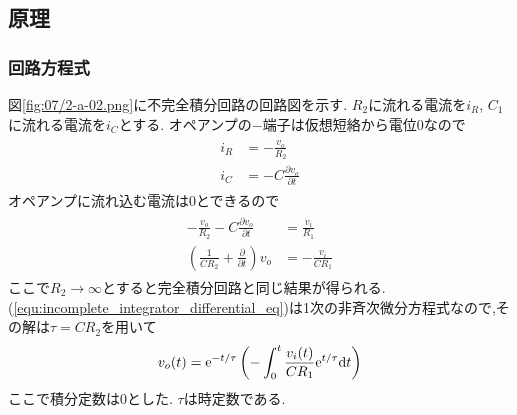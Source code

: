 \subsection{原理}
\subsubsection{回路方程式}
図\ref{fig:07/2-a-02.png}に不完全積分回路の回路図を示す.
$R_2$に流れる電流を$i_R$, $C_1$に流れる電流を$i_C$とする.
オペアンプの$-$端子は仮想短絡から電位0なので
\begin{align}
  \begin{split}
    i_R&=-\frac{v_o}{R_2}\\
    i_C&=-C\frac{\partial v_o}{\partial t}
  \end{split}
\end{align}
オペアンプに流れ込む電流は0とできるので
\begin{align}
  \begin{split}
    \label{equ:incomplete_integrator_differential_eq}
    -\frac{v_o}{R_2}-C\frac{\partial v_o}{\partial t}&=\frac{v_i}{R_1}\\
    \left(\frac{1}{CR_2}+\frac{\partial}{\partial t}\right)v_o&=-\frac{v_i}{CR_1}
  \end{split}
\end{align}
ここで$R_2\rightarrow\infty$とすると完全積分回路と同じ結果が得られる.
(\ref{equ:incomplete_integrator_differential_eq})は1次の非斉次微分方程式なので,その解は$\tau=CR_2$を用いて
\begin{align}
  \label{equ:incomplete_integrator_vo}
  v_o(t)={\rm e}^{-t/\tau}\left(-\int^t_0\frac{v_i(t)}{CR_1}{\rm e}^{t/\tau}{\rm d}t\right)
\end{align}
ここで積分定数は0とした.
$\tau$は時定数である.

